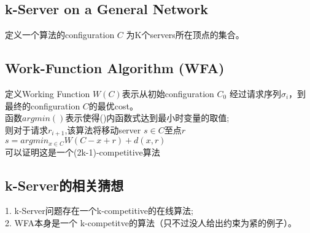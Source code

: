 \documentclass[11pt]{ctexart}
\begin{document}
\subsection{k-Server on a General Network}

定义一个算法的configuration $C$ 为K个servers所在顶点的集合。

\subsection{Work-Function Algorithm (WFA)}
定义Working Function $W(C)$表示从初始configuration $C_0$ 经过请求序列$\sigma_i$，到最终的configuration $C$的最优cost。\\

函数$arg min()$表示使得()内函数式达到最小时变量的取值;\\

则对于请求$r_{i+1}$,该算法将移动server $s \in C$至点$r$\\
$s=arg min_{x \in C}{W(C-x+r)+d(x,r)}$\\

可以证明这是一个(2k-1)-competitive算法\\


\subsection{k-Server的相关猜想}
1. k-Server问题存在一个k-competitive的在线算法;\\

2. WFA本身是一个 k-competitve的算法（只不过没人给出约束为紧的例子）。\\
\end{document}
